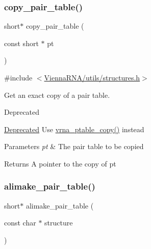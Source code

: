 \subsubsection{\texorpdfstring{copy\_pair\_table()}{copy\_pair\_table()}}
{\footnotesize\ttfamily short$\ast$ copy\+\_\+pair\+\_\+table (\begin{DoxyParamCaption}\item[{const short $\ast$}]{pt }\end{DoxyParamCaption})}



{\ttfamily \#include $<$\mbox{\hyperlink{utils_2structures_8h}{Vienna\+R\+N\+A/utils/structures.\+h}}$>$}



Get an exact copy of a pair table. 

\begin{DoxyRefDesc}{Deprecated}
\item[\mbox{\hyperlink{deprecated__deprecated000201}{Deprecated}}]Use \mbox{\hyperlink{group__struct__utils__pair__table_ga2daefbbd6d9f8803731651882f54332d}{vrna\+\_\+ptable\+\_\+copy()}} instead\end{DoxyRefDesc}

\begin{DoxyParams}{Parameters}
{\em pt} & The pair table to be copied \\
\hline
\end{DoxyParams}
\begin{DoxyReturn}{Returns}
A pointer to the copy of \textquotesingle{}pt\textquotesingle{} 
\end{DoxyReturn}
\mbox{\label{group__struct__utils__deprecated_ga3c81b3967056c3888b8472b65fbb16f5}} 
\subsubsection{\texorpdfstring{alimake\_pair\_table()}{alimake\_pair\_table()}}
{\footnotesize\ttfamily short$\ast$ alimake\+\_\+pair\+\_\+table (\begin{DoxyParamCaption}\item[{const char $\ast$}]{structure }\end{DoxyParamCaption})}



